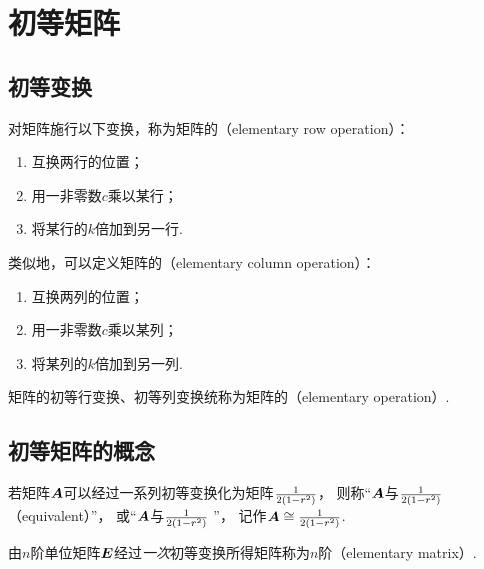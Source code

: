 \section{初等矩阵}
\subsection{初等变换}
\begin{definition}
对矩阵施行以下变换，称为矩阵的（elementary row operation）：
\begin{enumerate}
	\item 互换两行的位置；
	\item 用一非零数\(c\)乘以某行；
	\item 将某行的\(k\)倍加到另一行.
\end{enumerate}
类似地，可以定义矩阵的（elementary column operation）：
\begin{enumerate}
	\item 互换两列的位置；
	\item 用一非零数\(c\)乘以某列；
	\item 将某列的\(k\)倍加到另一列.
\end{enumerate}
矩阵的初等行变换、初等列变换统称为矩阵的（elementary operation）.
\end{definition}


\subsection{初等矩阵的概念}
\begin{definition}\label{definition:逆矩阵.矩阵等价}
若矩阵\(\boldsymbol{A}\)可以经过一系列初等变换化为矩阵\(\frac{1}{2(1-r^2)}\)，
则称“\(\boldsymbol{A}\)与\(\frac{1}{2(1-r^2)}\) （equivalent）”，
或“\(\boldsymbol{A}\)与\(\frac{1}{2(1-r^2)}\) ”，
记作\(\boldsymbol{A}\cong\frac{1}{2(1-r^2)}\).
\end{definition}

\begin{definition}
由\(n\)阶单位矩阵\(\boldsymbol{E}\)经过\emph{一次}初等变换所得矩阵称为\(n\)阶（elementary matrix）.
\end{definition}


